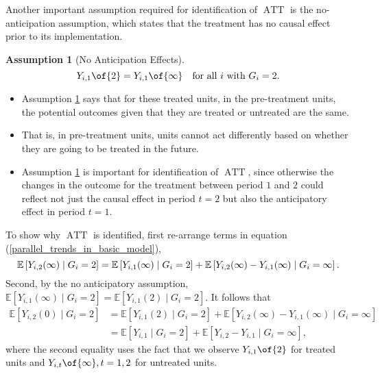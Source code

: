 \documentclass[12pt]{article}
\theoremstyle{definition}
\newtheorem{assumption}{Assumption}
\begin{document}
Another important assumption required for identification of $\operatorname*{ATT}$ is the no-anticipation assumption, which states that the treatment has no causal effect prior to its implementation. 

\begin{assumption}[No Anticipation Effects]  \label{NA_in_basic_model}
    \begin{equation}
        \label{eq_na_in_basic_model}
        Y_{i,1}\of{2} = Y_{i,1}\of{\infty}\quad \text{for all $i$ with $G_i = 2$}.
    \end{equation}
\end{assumption}

\begin{itemize}[topsep=0pt, leftmargin=20pt, itemsep=0pt]
	\setlength{\parskip}{10pt} 
	\item Assumption \ref{NA_in_basic_model} says that for these treated units, in the pre-treatment units, the potential outcomes given that they are treated or untreated are the same. 
	\item That is, in pre-treatment units, units cannot act differently based on whether they are going to be treated in the future.
	\item Assumption \ref{NA_in_basic_model} is important for identification of $\operatorname*{ATT}$, since otherwise the changes in the outcome for the treatment between period $1$ and $2$ could reflect not just the causal effect in period $t = 2$ but also the anticipatory effect in period $t = 1$.
\end{itemize}



To show why $\operatorname*{ATT}$ is identified, first re-arrange terms in equation (\ref{parallel_trends_in_basic_model}), 
\begin{equation}
    \notag 
    \mathbb{E}\left[Y_{i, 2}(\infty) \mid G_i = 2\right]=\mathbb{E}\left[Y_{i, 1}(\infty) \mid G_i = 2\right]+\mathbb{E}\left[Y_{i, 2}(\infty)-Y_{i, 1}(\infty) \mid G_i = \infty\right] .
\end{equation}
Second, by the no anticipatory assumption, $\mathbb{E}\left[Y_{i, 1}(\infty) \mid G_i = 2\right] = \mathbb{E}\left[Y_{i, 1}(2) \mid G_i = 2\right]$. It follows that 
$$
\begin{aligned}
\mathbb{E}\left[Y_{i, 2}(0) \mid G_i = 2\right] & =\mathbb{E}\left[Y_{i, 1}(2) \mid G_i = 2\right]+ \mathbb{E}\left[Y_{i, 2}(\infty)-Y_{i, 1}(\infty) \mid G_i = \infty\right] \\
& =\mathbb{E}\left[Y_{i, 1} \mid G_i = 2\right]+\mathbb{E}\left[Y_{i, 2}-Y_{i, 1} \mid G_i = \infty\right],
\end{aligned}
$$
where the second equality uses the fact that we observe $Y_{i, 1}\of{2}$ for treated units and $Y_{i, t}\of{\infty}, t = 1, 2$ for untreated units. 
\end{document}
